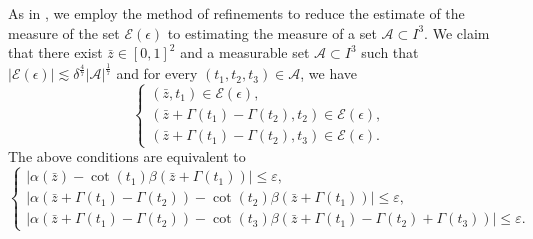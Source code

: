 \documentclass[a4paper,reqno]{amsart}
\theoremstyle{definition}
\theoremstyle{remark}
\numberwithin{equation}{section}
\begin{document}
	As in \cite{CDR}, we employ the method of refinements to reduce the estimate of the measure of the set $\mathcal{E}(\epsilon)$ to estimating the measure of a set $\mathcal{A}\subset I^3$. We claim that there exist ${\bar{z}}\in[0,1]^2$ and a measurable set $\mathcal{A}\subset I^3$ such that $|\mathcal{E}(\epsilon)|\lesssim\delta^{\frac{4}{7}}|\mathcal{A}|^{\frac{1}{7}}$ and for every $(t_1,t_2,t_3)\in\mathcal{A}$, we have
	\begin{equation}\label{refine1}
		\left\{\begin{array}{l}
			\left({\bar{z}},t_{1}\right) \in \mathcal{E}(\epsilon), \\
			\left({\bar{z}}+ \Gamma(t_1)-\Gamma(t_2), t_{2}\right) \in \mathcal{E}(\epsilon), \\
			\left({\bar{z}}+\Gamma(t_1)-\Gamma(t_2), t_{3}\right) \in \mathcal{E}(\epsilon).
		\end{array}\right.
	\end{equation}
	The above conditions are equivalent to 
	\begin{equation}\label{refine2}
		\left\{\begin{array}{l}
			\left|\alpha({\bar{z}})-\cot\left(t_{1}\right) \beta\left({\bar{z}}+\Gamma(t_1)\right)\right| \leq \varepsilon, \\
			|\alpha\left({\bar{z}}+\Gamma(t_1)-\Gamma(t_2)\right)-\cot\left(t_{2}\right) \beta\left({\bar{z}}+\Gamma(t_1)\right)| \leq \varepsilon, \\
			\left|\alpha\left({\bar{z}}+\Gamma(t_1)-\Gamma(t_2)\right)-\cot\left(t_{3}\right) \beta\left({\bar{z}}+\Gamma(t_1)-\Gamma(t_2)+\Gamma(t_3)\right)\right| \leq \varepsilon.
		\end{array}\right.
	\end{equation}
	
\end{document}

